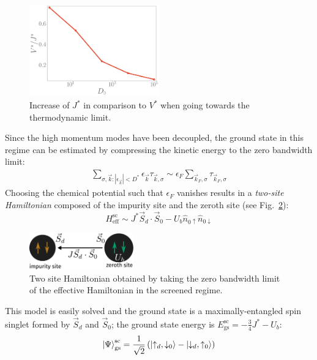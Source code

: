 \documentclass[reprint,superscriptaddress,floatfix]{revtex4-2}
\begin{document}
\begin{figure}[!htb]
	\centering
	\includegraphics[width=0.5\textwidth]{J_bandwidth.pdf}
	\caption{Increase of \(J^*\) in comparison to \(V^*\) when going towards the thermodynamic limit.}
	\label{J_bandwidth}
\end{figure}

Since the high momentum modes have been decoupled, the ground state in this regime can be estimated by compressing the kinetic energy to the zero bandwidth limit: 
\begin{equation}\begin{aligned}
	\sum_{\sigma,\vec k:|\epsilon_{\vec k}| < D^*} \epsilon_{\vec k} \tau_{\vec k,\sigma} \sim \epsilon_F \sum_{\vec k_F,\sigma}\tau_{\vec k_F,\sigma}
\end{aligned}\end{equation}
Choosing the chemical potential such that \(\epsilon_F\) vanishes results in a {\it two-site Hamiltonian} composed of the impurity site and the zeroth site (see Fig.~\ref{zero-bw}):
\begin{equation}
	\label{two-site}
	H_\text{eff}^\text{sc} \sim J^* \vec{S}_d\cdot\vec{S}_0 - U_b \hat n_{0 \uparrow} \hat n_{0 \downarrow}
\end{equation}
\begin{figure}[htpb]
	\centering
	\includegraphics[width=0.4\textwidth]{zeromode_eff.pdf}
	\caption{Two site Hamiltonian obtained by taking the zero bandwidth limit of the effective Hamiltonian in the screened regime.}
	\label{zero-bw}
\end{figure}
This model is easily solved and the ground state is a maximally-entangled spin singlet formed by \(\vec S_d\) and \(\vec S_0\); the ground state energy is \(E_\text{gs}^\text{sc} = -\frac{3}{4}J^* - U_b\):
\begin{equation}\begin{aligned}
	\ket{\Psi}_\text{gs}^\text{sc} = \frac{1}{\sqrt 2}\left(\ket{\uparrow_d,\downarrow_0} - \ket{\downarrow_d,\uparrow_0}\right)
\end{aligned}\end{equation}
\end{document}
